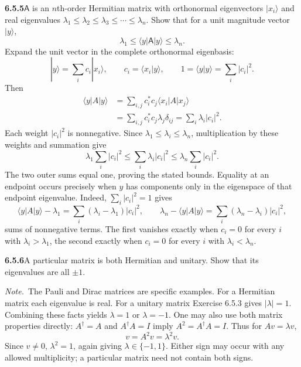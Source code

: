 \par\bigskip
\noindent\textbf{6.5.5}\quad $\mathsf{A}$ is an $n$th-order Hermitian matrix
with orthonormal eigenvectors $|x_{i}\rangle$ and real eigenvalues
$\lambda_{1}\le\lambda_{2}\le\lambda_{3}\le\cdots\le\lambda_{n}$. Show that
for a unit magnitude vector $|y\rangle$,
\[
\lambda_{1}\le\langle y|\mathsf{A}|y\rangle\le\lambda_{n}.
\]
\solution
Expand the unit vector in the complete orthonormal eigenbasis:
\[
|y\rangle=\sum_i c_i|x_i\rangle,
\qquad c_i=\langle x_i|y\rangle,
\qquad1=\langle y|y\rangle=\sum_i|c_i|^2.
\]
Then
\begin{align*}
\langle y|A|y\rangle
&=\sum_{i,j}c_i^*c_j\langle x_i|A|x_j\rangle\\
&=\sum_{i,j}c_i^*c_j\lambda_j\delta_{ij}
=\sum_i\lambda_i|c_i|^2.
\end{align*}
Each weight $|c_i|^2$ is nonnegative. Since
$\lambda_1\le\lambda_i\le\lambda_n$, multiplication by these weights
and summation give
\[
\lambda_1\sum_i|c_i|^2
\le\sum_i\lambda_i|c_i|^2
\le\lambda_n\sum_i|c_i|^2.
\]
The two outer sums equal one, proving the stated bounds. Equality at
an endpoint occurs precisely when $y$ has components only in the
eigenspace of that endpoint eigenvalue. Indeed, $\sum_i|c_i|^2=1$ gives
\[
\langle y|A|y\rangle-\lambda_1=\sum_i(\lambda_i-\lambda_1)|c_i|^2,
\qquad
\lambda_n-\langle y|A|y\rangle=\sum_i(\lambda_n-\lambda_i)|c_i|^2,
\]
sums of nonnegative terms. The first vanishes exactly when $c_i=0$ for
every $i$ with $\lambda_i>\lambda_1$, the second exactly when $c_i=0$
for every $i$ with $\lambda_i<\lambda_n$.

\par\bigskip
\noindent\textbf{6.5.6}\quad A particular matrix is both Hermitian and
unitary. Show that its eigenvalues are all $\pm1$.

\emph{Note.}~The Pauli and Dirac matrices are specific examples.
\solution
For a Hermitian matrix each eigenvalue is real. For a unitary
matrix Exercise 6.5.3 gives $|\lambda|=1$. Combining these facts yields
$\lambda=1$ or $\lambda=-1$.
One may also use both matrix properties directly: $A^\dagger=A$ and
$A^\dagger A=I$ imply $A^2=A^\dagger A=I$. Thus for $Av=\lambda v$,
\[
v=A^2v=\lambda^2v.
\]
Since $v\ne0$, $\lambda^2=1$, again giving
$\boxed{\lambda\in\{-1,1\}}$. Either sign may occur with any allowed
multiplicity; a particular matrix need not contain both signs.

